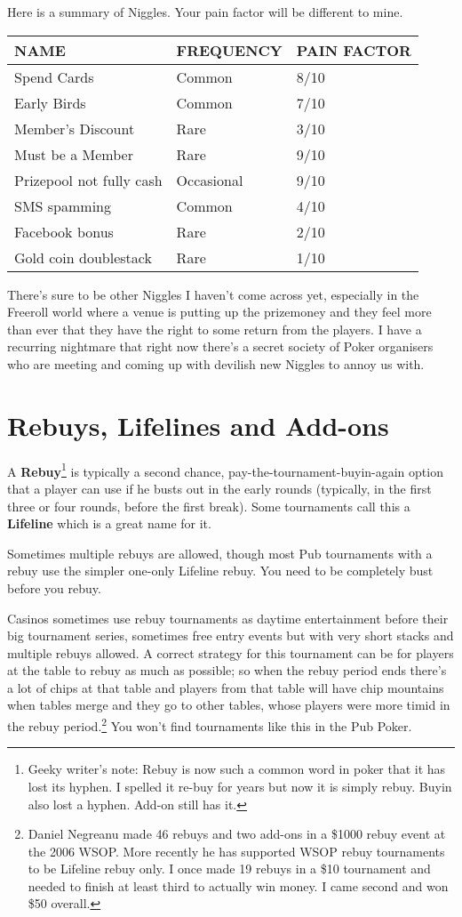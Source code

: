Here is a summary of Niggles. Your pain factor will be different to
mine.

\begin{tabular}{|l|l|l|} \hline
NAME    &  FREQUENCY  & PAIN FACTOR\\ \hline
Spend Cards & Common  & 8/10\\ \hline
Early Birds & Common & 7/10\\ \hline
Member's Discount & Rare  & 3/10\\ \hline
Must be a Member & Rare  & 9/10\\ \hline
Prizepool not fully cash & Occasional & 9/10\\ \hline
SMS spamming & Common & 4/10\\ \hline
Facebook bonus & Rare & 2/10 \\ \hline
Gold coin doublestack & Rare & 1/10 \\ \hline
\end{tabular}

There's sure to be other Niggles I haven't come across yet,
especially in the Freeroll world where a venue is putting up the
prizemoney and they feel more than ever that they have the right
to some return from the players. I have a recurring
nightmare that right now there's a secret society of Poker organisers
who are meeting and coming up with devilish new Niggles to annoy us with.

\section{Rebuys, Lifelines and Add-ons}

A \textbf{Rebuy}\footnote{Geeky writer's note: Rebuy is now such a
  common word in poker that it has lost its hyphen. I spelled it
  re-buy for years but now it is simply rebuy. Buyin also lost a
  hyphen. Add-on still has it.}
is typically a second chance, pay-the-tournament-buyin-again
option that a player can use if he busts out in the early rounds
(typically, in the first three or four rounds, before the first
break). Some tournaments call this a \textbf{Lifeline} which is a
great name for it.

Sometimes multiple rebuys are allowed, though most Pub tournaments
with a rebuy use the simpler one-only Lifeline rebuy. You
need to be completely bust before you rebuy.

Casinos sometimes use rebuy tournaments as daytime entertainment
before their big tournament series, sometimes free entry events
but with very short stacks and multiple rebuys allowed. A correct
strategy for this tournament can be for players at the table
to rebuy as much as possible; so when the rebuy period ends there's
a lot of chips at that table and players from that table will
have chip mountains when tables merge and they go to
other tables, whose players were more timid in the rebuy
period.\footnote{Daniel Negreanu made 46 rebuys and two add-ons
  in a \$1000 rebuy event at the 2006 WSOP. More recently he has
  supported WSOP rebuy tournaments to be Lifeline rebuy only. I once
  made 19 rebuys in a \$10 tournament and needed to finish at least
  third to actually win money. I came second and won \$50 overall.} You
won't find tournaments like this in the Pub Poker.

